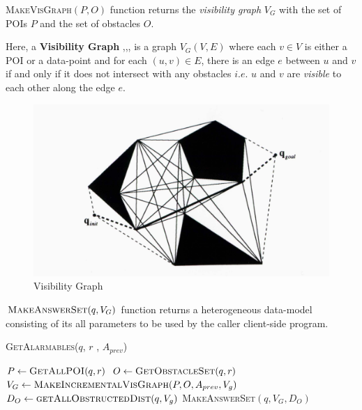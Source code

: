 \textsc{MakeVisGraph}$(P,O)$ function returns the \textit{visibility graph} $V_G$ with the set of POIs $P$ and the set of obstacles $O$.

Here, a \textbf{Visibility Graph} \cite{VG1},\cite{VG2},\cite{VG3},\cite{VG4} is a graph $V_G(V,E)$ where each $v \in V$ is either a POI or a data-point and for each $(u,v) \in E$, there is an edge $e$ between $u$ and $v$ if and only if it does not intersect with any obstacles $i.e.$ $u$ and $v$ are \textit{visible} to each other along the edge $e$.\\

\begin{figure}[h]
  \includegraphics[width=\linewidth]{visibility_graph.jpg}
  \caption{Visibility Graph}
  \label{fig:visgraph}
\end{figure}
\vspace{5pt}
$\textsc{MakeAnswerSet}(q, V_G)$ function returns a heterogeneous data-model consisting of its all parameters to be used by the caller client-side program.


\DontPrintSemicolon
\begin{algorithm}
\caption{\textsc{GetAlarmables}($q$, $r$ , $A_{prev}$)}
	
	 $P \gets \textsc{GetAllPOI}(q, r)$ \;
	 $O \gets \textsc{GetObstacleSet}(q, r)$ \;
	 $V_G \gets \textsc{MakeIncrementalVisGraph}(P, O, A_{prev},V_g)$ \;
	 $D_O \gets \textsc{getAllObstructedDist}( q, V_g )$
	\Return \textsc{MakeAnswerSet}$(q, V_G,D_O)$ \;
\label{GetAlarmables}
\end{algorithm}

